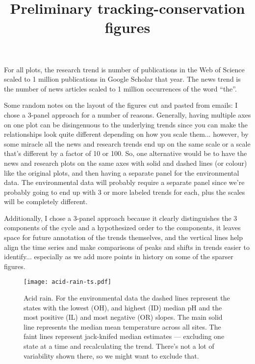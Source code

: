 \documentclass[12pt]{article}
\title{Preliminary tracking-conservation figures}
\begin{document}
\maketitle

For all plots, the research trend is number of publications in the Web of Science scaled to 1 million publications in Google Scholar that year. The news trend is the number of news articles scaled to 1 million occurrences of the word ``the''.

Some random notes on the layout of the figures cut and pasted from emails:
I chose a 3-panel approach for a number of reasons. Generally, having multiple axes on one plot can be disingenuous to the
underlying trends since you can make the relationships look quite
different depending on how you scale them... however, by some miracle
all the news and research trends end up on the same scale or a scale
that's different by a factor of 10 or 100. So, one
alternative would be to have the news and research plots on the same
axes with solid and dashed lines (or colour) like the original plots, and then having a separate panel for the environmental data. The
environmental data will probably require a separate panel since we're
probably going to end up with 3 or more labeled trends for each, plus
the scales will be completely different.

Additionally, I chose a 3-panel approach because it clearly distinguishes the 3 components of the cycle and a
hypothesized order to the components, it leaves space for future annotation of the trends themselves, and the vertical lines help align the time series and make comparisons
of peaks and shifts in trends easier to identify... especially as we
add more points in history on some of the sparser figures.




\begin{figure}[htbp]
	\centering
		\texttt{[image: acid-rain-ts.pdf]}
	\caption{Acid rain. For the environmental data the dashed lines represent the states with the lowest (OH), and highest (ID) median pH and the most positive (IL) and most negative (OR) slopes. The main solid line represents the median mean temperature across all sites. The faint lines represent jack-knifed median estimates --- excluding one state at a time and recalculating the trend. There's not a lot of variability shown there, so we might want to exclude that.}
	\label{fig:acid-rain-ts}
\end{figure}
\end{document}
